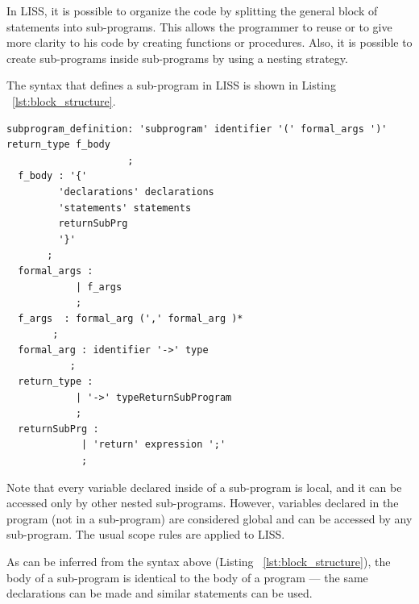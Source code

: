 \documentclass[
  oneside,
  11pt, a4paper,
  footinclude=true,
  headinclude=true,
  cleardoublepage=empty
]{scrbook}
\begin{document}
In LISS, it is possible to organize the code by splitting the general block of statements into sub-programs. This allows the programmer to reuse or to give more clarity to his code by creating functions or procedures.
Also, it is possible to create sub-programs inside sub-programs by using a nesting strategy.

The syntax that defines a sub-program in LISS is shown in Listing ~\ref{lst:block_structure}.

\begin{lstlisting}[caption={CFG for block structure in LISS},label={lst:block_structure}]
  subprogram_definition: 'subprogram' identifier '(' formal_args ')' return_type f_body
                     ;
  f_body : '{'
         'declarations' declarations
         'statements' statements
         returnSubPrg
         '}'
       ;
  formal_args :
            | f_args
            ;
  f_args  : formal_arg (',' formal_arg )*
        ;
  formal_arg : identifier '->' type
           ;
  return_type :
            | '->' typeReturnSubProgram
            ;
  returnSubPrg :
             | 'return' expression ';'
             ;
\end{lstlisting}

Note that every variable declared inside of a sub-program is local, and it can be accessed only by other nested sub-programs.
However, variables declared in the program (not in a sub-program) are considered global and can be accessed by any sub-program. The usual scope rules are applied to LISS.

As can be inferred from the syntax above (Listing ~\ref{lst:block_structure}), the body of a sub-program is identical to the body of a program --- the same declarations can be made and similar statements can be used.














\newpage


\end{document}
